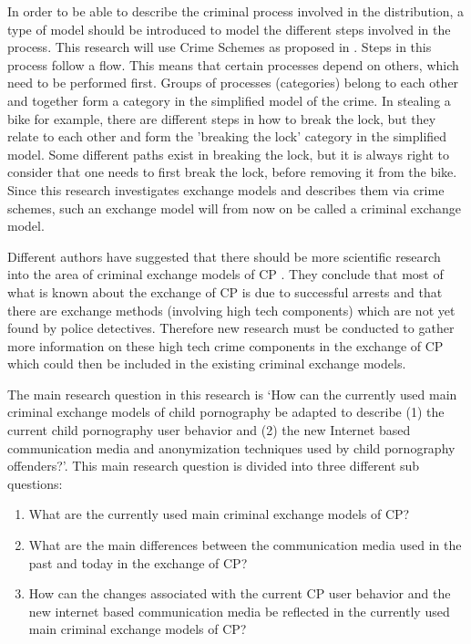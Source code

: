 \documentclass{sig-alternate-br}
\begin{document}
In order to be able to describe the criminal process involved in the distribution, a type of model should be introduced to model the different steps involved in the process. This research will use Crime Schemes as proposed in \cite{willison2006understanding}. Steps in this process follow a flow. This means that certain processes depend on others, which need to be performed first. Groups of processes (categories) belong to each other and together form a category in the simplified model of the crime. In stealing a bike for example, there are different steps in how to break the lock, but they relate to each other and form the 'breaking the lock' category in the simplified model. Some different paths exist in breaking the lock, but it is always right to consider that one needs to first break the lock, before removing it from the bike. Since this research investigates exchange models and describes them via crime schemes, such an exchange model will from now on be called a criminal exchange model.

Different authors have suggested that there should be more scientific research into the area of criminal exchange models of CP \cite{wijk2009achter, wolak2005child, zee2007kinderpornografische}. They conclude that most of what is known about the exchange of CP is due to successful arrests and that there are exchange methods (involving high tech components) which are not yet found by police detectives. Therefore new research must be conducted to gather more information on these high tech crime components in the exchange of CP which could then be included in the existing criminal exchange models.

The main research question in this research is `How can the currently used main criminal exchange models of child pornography be adapted to describe (1) the current child pornography user behavior and (2) the new Internet based communication media and anonymization techniques used by child pornography offenders?'. This main research question is divided into three different sub questions:
\begin{enumerate}
	\item What are the currently used main criminal exchange models of CP?
	\item What are the main differences between the communication media used in the past and today in the exchange of CP?
	\item How can the changes associated with the current CP user behavior and the new internet based communication media be reflected in the currently used main criminal exchange models of CP? 
\end{enumerate}
\end{document}
